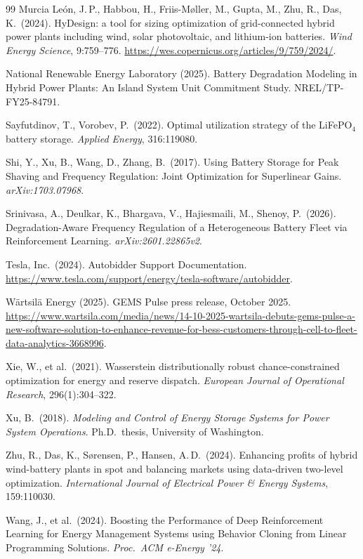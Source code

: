 \documentclass[11pt]{article}
\begin{document}
\begin{thebibliography}{99}
Murcia Le\'{o}n, J.\,P., Habbou, H., Friis-M\o ller, M., Gupta, M., Zhu, R., Das, K.\ (2024). HyDesign: a tool for sizing optimization of grid-connected hybrid power plants including wind, solar photovoltaic, and lithium-ion batteries. \emph{Wind Energy Science}, 9:759--776. \url{https://wes.copernicus.org/articles/9/759/2024/}.

National Renewable Energy Laboratory (2025). Battery Degradation Modeling in Hybrid Power Plants: An Island System Unit Commitment Study. NREL/TP-FY25-84791.

Sayfutdinov, T., Vorobev, P.\ (2022). Optimal utilization strategy of the LiFePO\(_4\) battery storage. \emph{Applied Energy}, 316:119080.

Shi, Y., Xu, B., Wang, D., Zhang, B.\ (2017). Using Battery Storage for Peak Shaving and Frequency Regulation: Joint Optimization for Superlinear Gains. \emph{arXiv:1703.07968}.

Srinivasa, A., Deulkar, K., Bhargava, V., Hajiesmaili, M., Shenoy, P.\ (2026). Degradation-Aware Frequency Regulation of a Heterogeneous Battery Fleet via Reinforcement Learning. \emph{arXiv:2601.22865v2}.

Tesla, Inc.\ (2024). Autobidder Support Documentation. \url{https://www.tesla.com/support/energy/tesla-software/autobidder}.

W\"{a}rtsil\"{a} Energy (2025). GEMS Pulse press release, October 2025. \url{https://www.wartsila.com/media/news/14-10-2025-wartsila-debuts-gems-pulse-a-new-software-solution-to-enhance-revenue-for-bess-customers-through-cell-to-fleet-data-analytics-3668996}.

Xie, W., et al.\ (2021). Wasserstein distributionally robust chance-constrained optimization for energy and reserve dispatch. \emph{European Journal of Operational Research}, 296(1):304--322.

Xu, B.\ (2018). \emph{Modeling and Control of Energy Storage Systems for Power System Operations}. Ph.D.\ thesis, University of Washington.

Zhu, R., Das, K., S\o rensen, P., Hansen, A.\,D.\ (2024). Enhancing profits of hybrid wind-battery plants in spot and balancing markets using data-driven two-level optimization. \emph{International Journal of Electrical Power \& Energy Systems}, 159:110030.

Wang, J., et al.\ (2024). Boosting the Performance of Deep Reinforcement Learning for Energy Management Systems using Behavior Cloning from Linear Programming Solutions. \emph{Proc.\ ACM e-Energy '24}.

\end{thebibliography}
\end{document}
